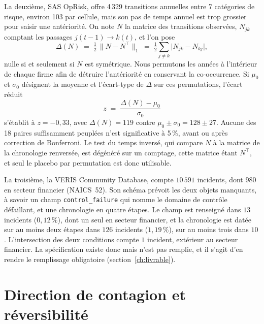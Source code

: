 La deuxième, SAS OpRisk, offre 4\,329 transitions annuelles entre 7 catégories de risque, environ 103
par cellule, mais son pas de temps annuel est trop grossier pour saisir une antériorité. On note $N$
la matrice des transitions observées, $N_{jk}$ comptant les passages $j(t-1)\to k(t)$, et l'on pose
\begin{equation}
  \Delta(N) \;=\; \tfrac{1}{2}\,\lVert N - N^{\top}\rVert_1
        \;=\; \tfrac{1}{2}\sum_{j\neq k}\bigl|N_{jk}-N_{kj}\bigr| ,
  \label{eq:asymetrie}
\end{equation}
nulle si et seulement si $N$ est symétrique. Nous permutons les années à l'intérieur de chaque firme
afin de détruire l'antériorité en conservant la co-occurrence. Si $\mu_0$ et $\sigma_0$ désignent la
moyenne et l'écart-type de $\Delta$ sur ces permutations, l'écart réduit
\begin{equation}
  z \;=\; \frac{\Delta(N)-\mu_0}{\sigma_0}
  \label{eq:placebo-z}
\end{equation}
s'établit à $z = -0{,}33$, avec $\Delta(N) = 119$ contre $\mu_0 \pm \sigma_0 = 128 \pm 27$. Aucune des 18
paires suffisamment peuplées n'est significative à 5\,\%, avant ou après correction de Bonferroni. Le
test du temps inversé, qui compare $N$ à la matrice de la chronologie renversée, est dégénéré sur un
comptage, cette matrice étant $N^\top$, et seul le placebo par permutation est donc utilisable.

La troisième, la VERIS Community Database, compte $10\,591$ incidents, dont $980$ en secteur
financier (NAICS~52). Son schéma prévoit les deux objets manquants, à savoir un champ
\texttt{control\_failure} qui nomme le domaine de contrôle défaillant, et une chronologie en quatre
étapes. Le champ est renseigné dans $13$ incidents ($0{,}12\,\%$), dont un seul en secteur financier,
et la chronologie est datée sur au moins deux étapes dans $126$ incidents ($1{,}19\,\%$), sur au moins
trois dans $10$. L'intersection des deux conditions compte $1$ incident, extérieur au secteur
financier. La spécification existe donc mais n'est pas remplie, et il s'agit d'en rendre le
remplissage obligatoire (section~\ref{ch:livrable}).




\section{Direction de contagion et réversibilité}

